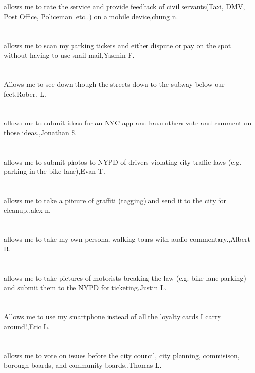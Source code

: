 \section{}allows me to rate the service and provide feedback of civil servants(Taxi, DMV, Post Office, Policeman, etc..) on a mobile device,chung n.	
\section{}allows me to scan my parking tickets and either dispute or pay on the spot without having to use snail mail,Yasmin F.	
\section{}Allows me to see down though the streets down to the subway below our feet,Robert L.	
\section{}allows me to submit ideas for an NYC app and have others vote and comment on those ideas.,Jonathan S.	
\section{}allows me to submit photos to NYPD of drivers violating city traffic laws (e.g. parking in the bike lane),Evan T.	
\section{}allows me to take a pitcure of graffiti (tagging) and send it to the city for cleanup.,alex n.
\section{}allows me to take my own personal walking tours with audio commentary.,Albert R.
\section{}allows me to take pictures of motorists breaking the law (e.g. bike lane parking) and submit them to the NYPD for ticketing,Justin L.
\section{}Allows me to use my smartphone instead of all the loyalty cards I carry around!,Eric L.
\section{}allows me to vote on issues before the city council, city planning, commisison, borough boards, and community boards.,Thomas L.
